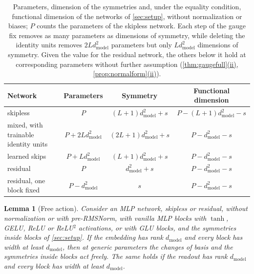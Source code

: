 \documentclass[10pt]{article}
\newtheorem{lemma}[theorem]{Lemma}
\theoremstyle{definition}
\theoremstyle{remark}
\newcommand{\dm}{d_{\mathrm{model}}}
\DeclareRobustCommand{\cpref}[2]{\hyperref[#1:#2]{\cref*{#1}(#2)}}
\begin{document}
\begin{table}[ht]
\centering\small
\caption{Parameters, dimension of the symmetries and, under the equality condition, functional dimension of the networks of \cref{sec:setup}, without normalization or biases; $P$ counts the parameters of the skipless network. Each step of the gauge fix removes as many parameters as dimensions of symmetry, while deleting the identity units removes $2L\dm^2$ parameters but only $L\dm^2$ dimensions of symmetry. Given the value for the residual network, the others below it hold at corresponding parameters without further assumption (\cpref{thm:gaugefull}{ii}, \cpref{prop:normalform}{ii}).}
\label{tab:ledger}
\begin{tabular}{lccc}
\toprule
Network & Parameters & Symmetry & Functional dimension \\
\midrule
skipless & $P$ & $(L+1)\dm^2 + s$ & $P - (L+1)\dm^2 - s$ \\
mixed, with trainable identity units & $P + 2L\dm^2$ & $(2L+1)\dm^2 + s$ & $P - \dm^2 - s$ \\
learned skips & $P + L\dm^2$ & $(L+1)\dm^2 + s$ & $P - \dm^2 - s$ \\
residual & $P$ & $\dm^2 + s$ & $P - \dm^2 - s$ \\
residual, one block fixed & $P - \dm^2$ & $s$ & $P - \dm^2 - s$ \\
\bottomrule
\end{tabular}
\end{table}

\begin{lemma}[Free action]\label{lem:free}
Consider an MLP network, skipless or residual, without normalization or with pre-RMSNorm, with vanilla MLP blocks with $\tanh$, GELU, ReLU or ReLU$^2$ activations, or with GLU blocks, and the symmetries inside blocks of \cref{sec:setup}. If the embedding has rank $\dm$ and every block has width at least $\dm$, then at generic parameters the changes of basis and the symmetries inside blocks act freely. The same holds if the readout has rank $\dm$ and every block has width at least $\dm$.
\end{lemma}
\end{document}
